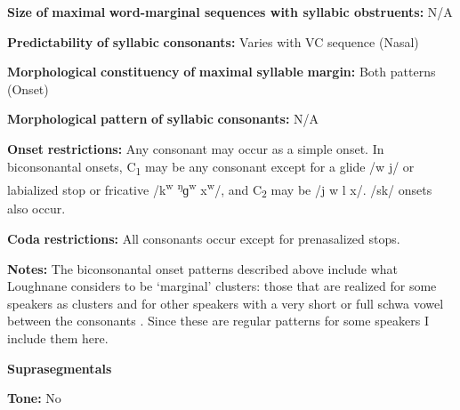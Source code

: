 \begin{styleBody}
\textbf{Size} \textbf{of} \textbf{maximal} \textbf{word{}-marginal sequences with syllabic obstruents:} N/A
\end{styleBody}

\begin{styleBody}
\textbf{Predictability} \textbf{of} \textbf{syllabic} \textbf{consonants:} Varies with VC sequence (Nasal)
\end{styleBody}

\begin{styleBody}
\textbf{Morphological} \textbf{constituency} \textbf{of} \textbf{maximal} \textbf{syllable} \textbf{margin:} Both patterns (Onset)
\end{styleBody}

\begin{styleBody}
\textbf{Morphological} \textbf{pattern} \textbf{of} \textbf{syllabic} \textbf{consonants:} N/A
\end{styleBody}

\begin{styleBody}
\textbf{Onset} \textbf{restrictions:} Any consonant may occur as a simple onset. In biconsonantal onsets, C\textsubscript{1} may be any consonant except for a glide /w j/ or labialized stop or fricative /k\textsuperscript{w} \textsuperscript{ŋ}ɡ\textsuperscript{w} x\textsuperscript{w}/, and C\textsubscript{2} may be /j w l x/. /sk/ onsets also occur.
\end{styleBody}

\begin{styleBody}
\textbf{Coda} \textbf{restrictions:} All consonants occur except for prenasalized stops.
\end{styleBody}

\begin{styleBody}
\textbf{Notes:} The biconsonantal onset patterns described above include what Loughnane considers to be ‘marginal’ clusters: those that are realized for some speakers as clusters and for other speakers with a very short or full schwa vowel between the consonants \citep[64-5]{Loughnane2009}. Since these are regular patterns for some speakers I include them here.
\end{styleBody}

\begin{styleBody}
\textbf{Suprasegmentals}
\end{styleBody}

\begin{styleBody}
\textbf{Tone:} No
\end{styleBody}

